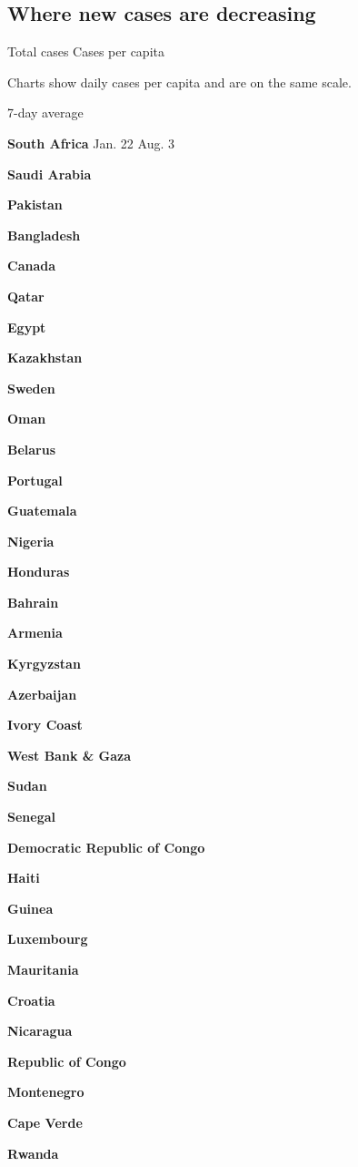 \hypertarget{where-new-cases-are-decreasing}{%
\subsection{Where new cases are
decreasing}\label{where-new-cases-are-decreasing}}

Total cases Cases per capita

Charts show daily cases per capita and are on the same scale.

7-day average

\textbf{South Africa} Jan. 22 Aug. 3

\textbf{Saudi Arabia}

\textbf{Pakistan}

\textbf{Bangladesh}

\textbf{Canada}

\textbf{Qatar}

\textbf{Egypt}

\textbf{Kazakhstan}

\textbf{Sweden}

\textbf{Oman}

\textbf{Belarus}

\textbf{Portugal}

\textbf{Guatemala}

\textbf{Nigeria}

\textbf{Honduras}

\textbf{Bahrain}

\textbf{Armenia}

\textbf{Kyrgyzstan}

\textbf{Azerbaijan}

\textbf{Ivory Coast}

\textbf{West Bank \& Gaza}

\textbf{Sudan}

\textbf{Senegal}

\textbf{Democratic Republic of Congo}

\textbf{Haiti}

\textbf{Guinea}

\textbf{Luxembourg}

\textbf{Mauritania}

\textbf{Croatia}

\textbf{Nicaragua}

\textbf{Republic of Congo}

\textbf{Montenegro}

\textbf{Cape Verde}

\textbf{Rwanda}

